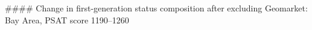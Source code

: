 #### Change in first-generation status composition after excluding Geomarket: Bay Area, PSAT score 1190–1260
